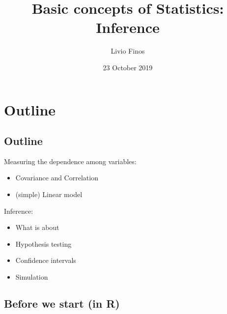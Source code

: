 \documentclass[]{article}
\title{Basic concepts of Statistics: Inference}
\author{Livio Finos}
\date{23 October 2019}
\providecommand{\tightlist}{%
  \setlength{\itemsep}{0pt}\setlength{\parskip}{0pt}}
\begin{document}
\maketitle

{
\setcounter{tocdepth}{2}
\tableofcontents
}
\hypertarget{outline}{%
\section{Outline}\label{outline}}

\hypertarget{outline-1}{%
\subsection{Outline}\label{outline-1}}

Measuring the dependence among variables:

\begin{itemize}
\tightlist
\item
  Covariance and Correlation\\
\item
  (simple) Linear model
\end{itemize}

Inference:

\begin{itemize}
\tightlist
\item
  What is about
\item
  Hypothesis testing
\item
  Confidence intervals
\item
  Simulation
\end{itemize}

\hypertarget{before-we-start-in-r}{%
\subsection{Before we start (in R)}\label{before-we-start-in-r}}
\end{document}
